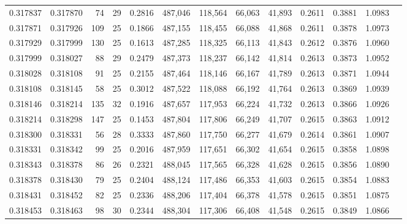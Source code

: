 \begin{tabular}{rrrrrrrrrrrrr}
0.317837 & 0.317870 &    74 &  29 &                                     0.2816 & 487,046 & 118,564 &  66,063 &  41,893 & 0.2611 & 0.3881 & 1.0983 \\
0.317871 & 0.317926 &   109 &  25 &                                     0.1866 & 487,155 & 118,455 &  66,088 &  41,868 & 0.2611 & 0.3878 & 1.0973 \\
0.317929 & 0.317999 &   130 &  25 &                                     0.1613 & 487,285 & 118,325 &  66,113 &  41,843 & 0.2612 & 0.3876 & 1.0960 \\
0.317999 & 0.318027 &    88 &  29 &                                     0.2479 & 487,373 & 118,237 &  66,142 &  41,814 & 0.2613 & 0.3873 & 1.0952 \\
0.318028 & 0.318108 &    91 &  25 &                                     0.2155 & 487,464 & 118,146 &  66,167 &  41,789 & 0.2613 & 0.3871 & 1.0944 \\
0.318108 & 0.318145 &    58 &  25 &                                     0.3012 & 487,522 & 118,088 &  66,192 &  41,764 & 0.2613 & 0.3869 & 1.0939 \\
0.318146 & 0.318214 &   135 &  32 &                                     0.1916 & 487,657 & 117,953 &  66,224 &  41,732 & 0.2613 & 0.3866 & 1.0926 \\
0.318214 & 0.318298 &   147 &  25 &                                     0.1453 & 487,804 & 117,806 &  66,249 &  41,707 & 0.2615 & 0.3863 & 1.0912 \\
0.318300 & 0.318331 &    56 &  28 &                                     0.3333 & 487,860 & 117,750 &  66,277 &  41,679 & 0.2614 & 0.3861 & 1.0907 \\
0.318331 & 0.318342 &    99 &  25 &                                     0.2016 & 487,959 & 117,651 &  66,302 &  41,654 & 0.2615 & 0.3858 & 1.0898 \\
0.318343 & 0.318378 &    86 &  26 &                                     0.2321 & 488,045 & 117,565 &  66,328 &  41,628 & 0.2615 & 0.3856 & 1.0890 \\
0.318378 & 0.318430 &    79 &  25 &                                     0.2404 & 488,124 & 117,486 &  66,353 &  41,603 & 0.2615 & 0.3854 & 1.0883 \\
0.318431 & 0.318452 &    82 &  25 &                                     0.2336 & 488,206 & 117,404 &  66,378 &  41,578 & 0.2615 & 0.3851 & 1.0875 \\
0.318453 & 0.318463 &    98 &  30 &                                     0.2344 & 488,304 & 117,306 &  66,408 &  41,548 & 0.2615 & 0.3849 & 1.0866 \\

\end{tabular}
